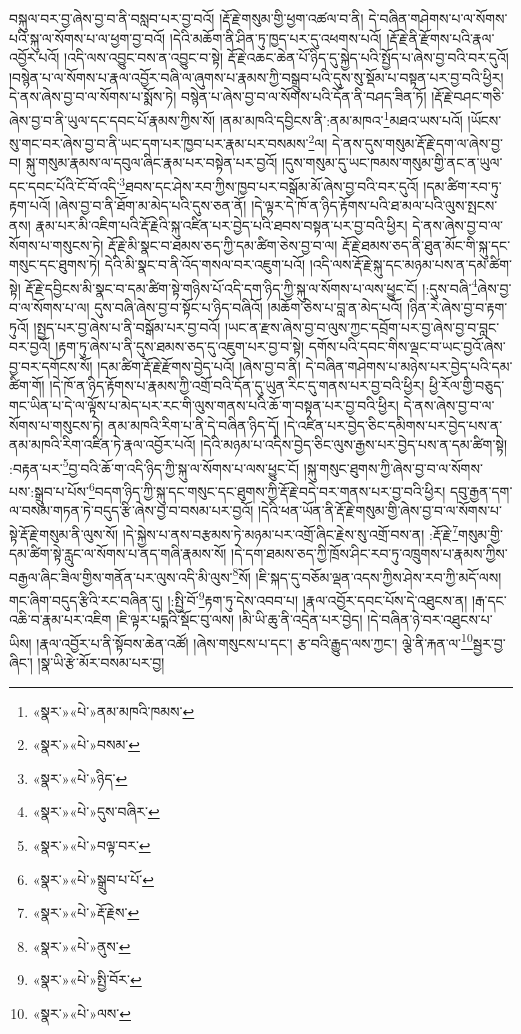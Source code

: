 བསྐུལ་བར་བྱ་ཞེས་བྱ་བ་ནི་བསླབ་པར་བྱ་བའོ། །རྡོ་རྗེ་གསུམ་གྱི་ཕྱག་འཚལ་བ་ནི། དེ་བཞིན་གཤེགས་པ་ལ་སོགས་པའི་སྐུ་ལ་སོགས་པ་ལ་ཕྱག་བྱ་བའོ། །དེའི་མཆོག་ནི་ཤིན་ཏུ་ཁྱད་པར་དུ་འཕགས་པའོ། །རྡོ་རྗེ་ནི་རྫོགས་པའི་རྣལ་འབྱོར་པའོ། །འདི་ལས་འབྱུང་བས་ན་འབྱུང་བ་སྟེ། རྡོ་རྗེ་འཆང་ཆེན་པོ་ཉིད་དུ་སྐྱེད་པའི་སྤྱོད་པ་ཞེས་བྱ་བའི་བར་དུའོ། །བསྙེན་པ་ལ་སོགས་པ་རྣལ་འབྱོར་བཞི་ལ་ཞུགས་པ་རྣམས་ཀྱི་བསྒྲུབ་པའི་དུས་སུ་སྡོམ་པ་བསྟན་པར་བྱ་བའི་ཕྱིར། དེ་ནས་ཞེས་བྱ་བ་ལ་སོགས་པ་སྨོས་ཏེ། བསྙེན་པ་ཞེས་བྱ་བ་ལ་སོགས་པའི་དོན་ནི་བཤད་ཟིན་ཏོ། །རྡོ་རྗེ་བཤང་གཅི་ཞེས་བྱ་བ་ནི་ཡུལ་དང་དབང་པོ་རྣམས་ཀྱིས་སོ། །ནམ་མཁའི་དབྱིངས་ནི་:ནམ་མཁའ་\footnote{«སྣར་»«པེ་»ནམ་མཁའི་ཁམས་}མཐའ་ཡས་པའོ། །ཡོངས་སུ་གང་བར་ཞེས་བྱ་བ་ནི་ཡང་དག་པར་ཁྱབ་པར་རྣམ་པར་བསམས་\footnote{«སྣར་»«པེ་»བསམ་}ལ། དེ་ནས་དུས་གསུམ་རྡོ་རྗེ་དག་ལ་ཞེས་བྱ་བ། སྐུ་གསུམ་རྣམས་ལ་དབུལ་ཞིང་རྣམ་པར་བསྟེན་པར་བྱའོ། །དུས་གསུམ་དུ་ཡང་ཁམས་གསུམ་གྱི་ནང་ན་ཡུལ་དང་དབང་པོའི་ངོ་བོ་འདི་\footnote{«སྣར་»«པེ་»ཉིད་}ཐབས་དང་ཤེས་རབ་ཀྱིས་ཁྱབ་པར་བསྒོམ་མོ་ཞེས་བྱ་བའི་བར་དུའོ། །དམ་ཚིག་རབ་ཏུ་རྟག་པའོ། །ཞེས་བྱ་བ་ནི་ཐོག་མ་མེད་པའི་དུས་ཅན་ནོ། །དེ་ལྟར་དེ་ཁོ་ན་ཉིད་རྟོགས་པའི་ཐ་མལ་པའི་ལུས་སྤངས་ནས། རྣམ་པར་མི་འཇིག་པའི་རྡོ་རྗེའི་སྐུ་འཛིན་པར་བྱེད་པའི་ཐབས་བསྟན་པར་བྱ་བའི་ཕྱིར། དེ་ནས་ཞེས་བྱ་བ་ལ་སོགས་པ་གསུངས་ཏེ། རྡོ་རྗེ་མི་སྣང་བ་ཐམས་ཅད་ཀྱི་དམ་ཚིག་ཅེས་བྱ་བ་ལ། རྡོ་རྗེ་ཐམས་ཅད་ནི་ཐུན་མོང་གི་སྐུ་དང་གསུང་དང་ཐུགས་ཏེ། དེའི་མི་སྣང་བ་ནི་འོད་གསལ་བར་འཇུག་པའོ། །འདི་ལས་རྡོ་རྗེ་སྐུ་དང་མཉམ་པས་ན་དམ་ཚིག་སྟེ། རྡོ་རྗེ་དབྱིངས་མི་སྣང་བ་དམ་ཚིག་སྟེ་གཉིས་པོ་འདི་དག་ཉིད་ཀྱི་སྐུ་ལ་སོགས་པ་ལས་ཕྱུང་ངོ། །:དུས་བཞི་\footnote{«སྣར་»«པེ་»དུས་བཞིར་}ཞེས་བྱ་བ་ལ་སོགས་པ་ལ། དུས་བཞི་ཞེས་བྱ་བ་སྟོང་པ་ཉིད་བཞིའོ། །མཆོག་ཅེས་པ་བླ་ན་མེད་པའོ། །ཉིན་རེ་ཞེས་བྱ་བ་རྟག་ཏུའོ། །སྤྱད་པར་བྱ་ཞེས་པ་ནི་བསྒོམ་པར་བྱ་བའོ། །ཡང་ན་རྫས་ཞེས་བྱ་བ་ལུས་ཀྱང་དབྲོག་པར་བྱ་ཞེས་བྱ་བ་བླང་བར་བྱའོ། །རྟག་ཏུ་ཞེས་པ་ནི་དུས་ཐམས་ཅད་དུ་འཇུག་པར་བྱ་བ་སྟེ། དགོས་པའི་དབང་གིས་ལྡང་བ་ཡང་བྱའོ་ཞེས་བྱ་བར་དགོངས་སོ། །དམ་ཚིག་རྡོ་རྗེ་རྫོགས་བྱེད་པའོ། །ཞེས་བྱ་བ་ནི། དེ་བཞིན་གཤེགས་པ་མཉེས་པར་བྱེད་པའི་དམ་ཚིག་གོ། །དེ་ཁོ་ན་ཉིད་རྟོགས་པ་རྣམས་ཀྱི་འགྲོ་བའི་དོན་དུ་ཡུན་རིང་དུ་གནས་པར་བྱ་བའི་ཕྱིར། ཕྱི་རོལ་གྱི་བཅུད་གང་ཡིན་པ་དེ་ལ་ལྟོས་པ་མེད་པར་རང་གི་ལུས་གནས་པའི་ཆོ་ག་བསྟན་པར་བྱ་བའི་ཕྱིར། དེ་ནས་ཞེས་བྱ་བ་ལ་སོགས་པ་གསུངས་ཏེ། ནམ་མཁའི་རིག་པ་ནི་དེ་བཞིན་ཉིད་དོ། །དེ་འཛིན་པར་བྱེད་ཅིང་དམིགས་པར་བྱེད་པས་ན་ནམ་མཁའི་རིག་འཛིན་ཏེ་རྣལ་འབྱོར་པའོ། །དེའི་མཉམ་པ་འདིས་བྱེད་ཅིང་ལུས་རྒྱས་པར་བྱེད་པས་ན་དམ་ཚིག་སྟེ། :བརྟན་པར་\footnote{«སྣར་»«པེ་»བལྟ་བར་}བྱ་བའི་ཆོ་ག་འདི་ཉིད་ཀྱི་སྐུ་ལ་སོགས་པ་ལས་ཕྱུང་ངོ། །སྐུ་གསུང་ཐུགས་ཀྱི་ཞེས་བྱ་བ་ལ་སོགས་པས་:སྒྲུབ་པ་པོས་\footnote{«སྣར་»«པེ་»སྒྲུབ་པ་པོ་}བདག་ཉིད་ཀྱི་སྐུ་དང་གསུང་དང་ཐུགས་ཀྱི་རྡོ་རྗེ་བདེ་བར་གནས་པར་བྱ་བའི་ཕྱིར། དབུ་རྒྱན་དག་ལ་བསམ་གཏན་ཏེ་བདུད་རྩི་ཞེས་བྱ་བ་བསམ་པར་བྱའོ། །དེའི་ཕན་ཡོན་ནི་རྡོ་རྗེ་གསུམ་གྱི་ཞེས་བྱ་བ་ལ་སོགས་པ་སྟེ་རྡོ་རྗེ་གསུམ་ནི་ལུས་སོ། །དེ་སྐྱེས་པ་ནས་བརྩམས་ཏེ་མཉམ་པར་འགྲོ་ཞིང་རྗེས་སུ་འགྲོ་བས་ན། :རྡོ་རྗེ་\footnote{«སྣར་»«པེ་»རྡོ་རྗེས་}གསུམ་གྱི་དམ་ཚིག་སྟེ་རླུང་ལ་སོགས་པ་ནད་གཞི་རྣམས་སོ། །དེ་དག་ཐམས་ཅད་ཀྱི་ཁྲོས་ཤིང་རབ་ཏུ་འཁྲུགས་པ་རྣམས་ཀྱིས་བརྒྱལ་ཞིང་ཟིལ་གྱིས་གནོན་པར་ལུས་འདི་མི་ལུས་\footnote{«སྣར་»«པེ་»ནུས་}སོ། །ཇི་སྐད་དུ་བཅོམ་ལྡན་འདས་ཀྱིས་ཤེས་རབ་ཀྱི་མདོ་ལས། གང་ཞིག་བདུད་རྩིའི་རང་བཞིན་དུ། །:སྤྱི་བོ་\footnote{«སྣར་»«པེ་»སྤྱི་བོར་}རྟག་ཏུ་དེས་འབབ་པ། །རྣལ་འབྱོར་དབང་པོས་དེ་འཐུངས་ན། །རྒ་དང་འཆི་བ་རྣམ་པར་འཇིག །ཇི་ལྟར་པདྨའི་སྡོང་བུ་ལས། །མི་ཡི་ཆུ་ནི་འདྲེན་པར་བྱེད། །དེ་བཞིན་ཉེ་བར་འཐུངས་པ་ཡིས། །རྣལ་འབྱོར་པ་ནི་སྟོབས་ཆེན་འཚོ། །ཞེས་གསུངས་པ་དང་། རྩ་བའི་རྒྱུད་ལས་ཀྱང་། ལྕེ་ནི་རྐན་ལ་\footnote{«སྣར་»«པེ་»ལས་}སྦྱར་བྱ་ཞིང་། །སྣ་ཡི་རྩེ་མོར་བསམ་པར་བྱ། 